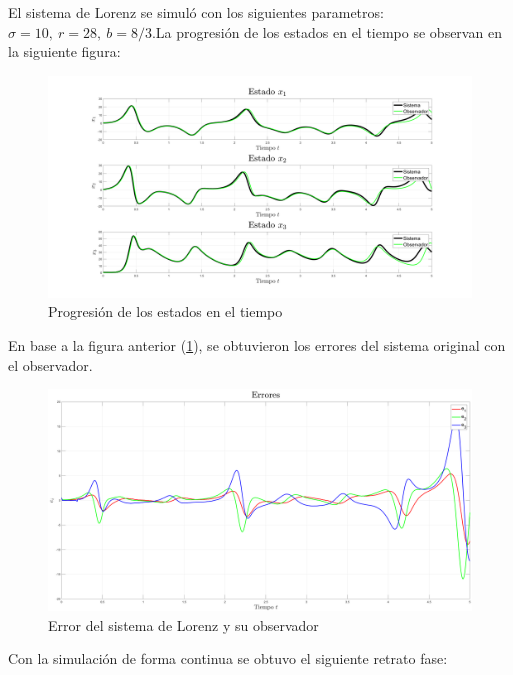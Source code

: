 El sistema de Lorenz se simuló con los siguientes parametros: $\sigma = 10, \ r = 28, \ b = 8/3$.La progresión de los estados en el tiempo se observan en la siguiente figura:

\begin{figure}[H]
	\centering
	\includegraphics[width=150mm]{img/E1_Estados_Disc.png}
	\caption{Progresión de los estados en el tiempo}
	\label{img:lorenzD2}
\end{figure}

En base a la figura anterior (\ref{img:lorenzD2}), se obtuvieron los errores del sistema original con el observador.

\begin{figure}[H]
	\centering
	\includegraphics[width=150mm]{img/E1_Errores_Disc.png}
	\caption{Error del sistema de Lorenz y su observador}
	\label{img:lorenzD3}
\end{figure}

Con la simulación de forma continua se obtuvo el siguiente retrato fase:

